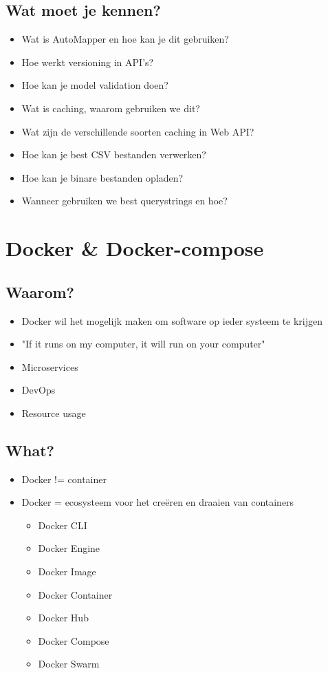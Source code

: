 \documentclass{article}
\begin{document}
\subsection{Wat moet je kennen?}

\begin{itemize}
    \item Wat is AutoMapper en hoe kan je dit gebruiken?
    \item Hoe werkt versioning in API's?
    \item Hoe kan je model validation doen?
    \item Wat is caching, waarom gebruiken we dit?
    \item Wat zijn de verschillende soorten caching in Web API?
    \item Hoe kan je best CSV bestanden verwerken?
    \item Hoe kan je binare bestanden opladen?
    \item Wanneer gebruiken we best querystrings en hoe?
\end{itemize}


\section{Docker \& Docker-compose}

\subsection{Waarom?}

\begin{itemize}
    \item Docker wil het mogelijk maken om software op ieder systeem te krijgen
    \item "If it runs on my computer, it will run on your computer"
    \item Microservices
    \item DevOps
    \item Resource usage
\end{itemize}

\subsection{What?}

\begin{itemize}
    \item Docker != container
    \item Docker = ecosysteem voor het creëren en draaien van containers
    \begin{itemize}
        \item Docker CLI
        \item Docker Engine
        \item Docker Image
        \item Docker Container
        \item Docker Hub
        \item Docker Compose
        \item Docker Swarm
    \end{itemize}
\end{itemize}
\end{document}
